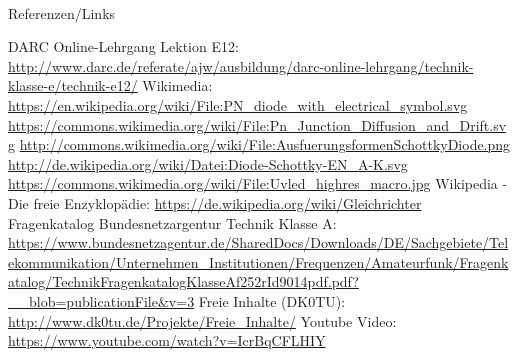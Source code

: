 \renewcommand{\refname}{Referenzen}

\hypertarget{refs}{}
\textcolor{white}{} \\ %
\Large Referenzen/Links
\footnotesize

\begin{thebibliography}{}
      DARC Online-Lehrgang Lektion E12:
                    \url{http://www.darc.de/referate/ajw/ausbildung/darc-online-lehrgang/technik-klasse-e/technik-e12/}
     	Wikimedia:
                    \url{https://en.wikipedia.org/wiki/File:PN_diode_with_electrical_symbol.svg}
                    \url{https://commons.wikimedia.org/wiki/File:Pn_Junction_Diffusion_and_Drift.svg}
                    \url{http://commons.wikimedia.org/wiki/File:AusfuerungsformenSchottkyDiode.png}
                    \url{http://de.wikipedia.org/wiki/Datei:Diode-Schottky-EN_A-K.svg}
                    \url{https://commons.wikimedia.org/wiki/File:Uvled_highres_macro.jpg}
                    \url{}
        Wikipedia - Die freie Enzyklopädie:
                    \url{https://de.wikipedia.org/wiki/Gleichrichter}
	   Fragenkatalog Bundesnetzargentur Technik Klasse A:                   
                    \url{https://www.bundesnetzagentur.de/SharedDocs/Downloads/DE/Sachgebiete/Telekommunikation/Unternehmen_Institutionen/Frequenzen/Amateurfunk/Fragenkatalog/TechnikFragenkatalogKlasseAf252rId9014pdf.pdf?__blob=publicationFile&v=3}
        Freie Inhalte (DK0TU):
                    \url{http://www.dk0tu.de/Projekte/Freie_Inhalte/}
         Youtube Video:                   
                    \url{https://www.youtube.com/watch?v=IcrBqCFLHIY}

\end{thebibliography} 


